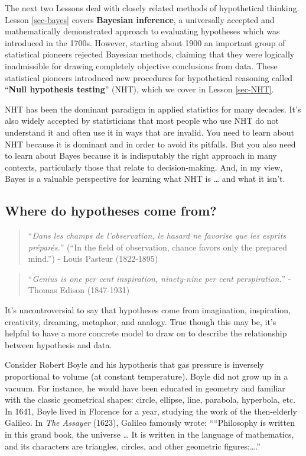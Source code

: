 \documentclass[
  letterpaper,
  DIV=11,
  numbers=noendperiod,
  oneside]{scrartcl}
\begin{document}
The next two Lessons deal with closely related methods of hypothetical
thinking. Lesson \ref{sec-bayes} covers \textbf{Bayesian inference}, a
universally accepted and mathematically demonstrated approach to
evaluating hypotheses which was introduced in the 1700s. However,
starting about 1900 an important group of statistical pioneers rejected
Bayesian methods, claiming that they were logically inadmissible for
drawing completely objective conclusions from data. These statistical
pioneers introduced new procedures for hypothetical reasoning called
``\textbf{Null hypothesis testing}'' (NHT), which we cover in Lesson
\ref{sec-NHT}.

NHT has been the dominant paradigm in applied statistics for many
decades. It's also widely accepted by statisticians that most people who
use NHT do not understand it and often use it in ways that are invalid.
You need to learn about NHT because it is dominant and in order to avoid
its pitfalls. But you also need to learn about Bayes because it is
indisputably the right approach in many contexts, particularly those
that relate to decision-making. And, in my view, Bayes is a valuable
perspective for learning what NHT is \ldots{} and what it isn't.

\subsection{Where do hypotheses come
from?}\label{where-do-hypotheses-come-from}

\begin{quote}
``\emph{Dans les champs de l'observation, le hasard ne favorise que les
esprits préparés.}'' (``In the field of observation, chance favors only
the prepared mind.'') - Louis Pasteur (1822-1895)
\end{quote}

\begin{quote}
``\emph{Genius is one per cent inspiration, ninety-nine per cent
perspiration.}'' - Thomas Edison (1847-1931)
\end{quote}

It's uncontroversial to say that hypotheses come from imagination,
inspiration, creativity, dreaming, metaphor, and analogy. True though
this may be, it's helpful to have a more concrete model to draw on to
describe the relationship between hypothesis and data.

Consider Robert Boyle and his hypothesis that gas pressure is inversely
proportional to volume (at constant temperature). Boyle did not grow up
in a vacuum. For instance, he would have been educated in geometry and
familiar with the classic geometrical shapes: circle, ellipse, line,
parabola, hyperbola, etc. In 1641, Boyle lived in Florence for a year,
studying the work of the then-elderly Galileo. In \emph{The Assayer}
(1623), Galileo famously wrote: ````Philosophy is written in this grand
book, the universe \ldots{} It is written in the language of
mathematics, and its characters are triangles, circles, and other
geometric figures;\ldots.''
\end{document}
